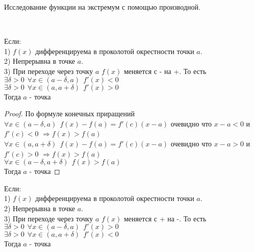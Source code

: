 \begin{title}[\Large]
  Исследование функции на экстремум с помощью производной.
\end{title}

\\
\begin{theorem}
  Если: \\
    1) $f(x)$ дифференцируема в проколотой окрестности точки $a$.\\
    2) Непрерывна в точке $a$.\\
    3) При переходе через точку $a$ $f(x)$ меняется с - на +. То есть\\
      $\exists \delta > 0 ~~ \forall x \in (a - \delta, a) ~~ f'(x) < 0$\\
      $\exists \delta > 0 ~~ \forall x \in (a, a + \delta) ~~ f'(x) > 0$\\
  Тогда $a$ - точка 
\end{theorem}

\begin{proof}
  По формуле конечных приращений\\
  $\forall x \in (a - \delta, a) ~~ f(x) - f(a) = f'(c)(x - a)$ очевидно что
  $x - a < 0$ и \\ $f'(c) < 0$ $\Rightarrow f(x) > f(a)$\\
  $\forall x \in (a, a + \delta) ~~ f(x) - f(a) = f'(c)(x - a)$ очевидно что
  $x - a > 0$ и \\ $f'(c) > 0$ $\Rightarrow f(x) > f(a)$\\
  $\forall x \in (a - \delta, a+ \delta) ~~ f(x) > f(a)$\\
  Тогда $a$ - точка 
\end{proof}

\begin{theorem}
  Если: \\
    1) $f(x)$ дифференцируема в проколотой окрестности точки $a$.\\
    2) Непрерывна в точке $a$.\\
    3) При переходе через точку $a$ $f(x)$ меняется с + на -. То есть\\
      $\exists \delta > 0 ~~ \forall x \in (a - \delta, a) ~~ f'(x) > 0$\\
      $\exists \delta > 0 ~~ \forall x \in (a, a + \delta) ~~ f'(x) < 0$\\
  Тогда $a$ - точка 
\end{theorem}

